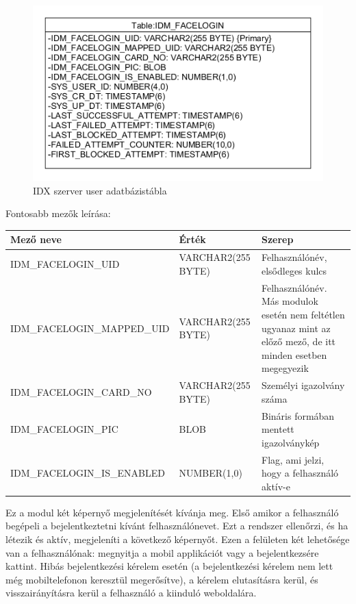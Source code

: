 \begin{figure}[h]
 \begin{minipage}{1\textwidth} 
\centering
    \includegraphics[scale=0.7]{img/facelogin_idm_db}
    \caption{IDX szerver user adatbázistábla}
 \end{minipage}
\end{figure}

Fontosabb mezők leírása:

\begin{tabular}{|p{6.5cm}|p{3cm} |p{4cm}|}
   	\hline
	\textbf{Mező neve} & \textbf{Érték} & \textbf{Szerep}\\ \hline
	IDM\_FACELOGIN\_UID & VARCHAR2(255 BYTE) & Felhasználónév, elsődleges kulcs \\ \hline
	IDM\_FACELOGIN\_MAPPED\_UID & VARCHAR2(255 BYTE) & Felhasználónév. Más modulok esetén nem feltétlen ugyanaz mint az előző mező, de itt minden esetben megegyezik \\ \hline
	IDM\_FACELOGIN\_CARD\_NO & VARCHAR2(255 BYTE)& Személyi igazolvány száma \\ \hline
	IDM\_FACELOGIN\_PIC & BLOB & Bináris formában mentett igazolványkép \\ \hline
	IDM\_FACELOGIN\_IS\_ENABLED & NUMBER(1,0) & Flag, ami jelzi, hogy a felhasználó aktív-e \\ \hline
	\end{tabular}


Ez a modul két képernyő megjelenítését kívánja meg. Első amikor a felhasználó begépeli a bejelentkeztetni kívánt felhasználónevet. Ezt a rendszer ellenőrzi, és ha létezik és aktív, megjeleníti a következő képernyőt. Ezen a felületen két lehetősége van a felhasználónak: megnyitja a mobil applikációt vagy a bejelentkezsére kattint. Hibás bejelentkezési kérelem esetén (a bejelentkezési kérelem nem lett még mobiltelefonon keresztül megerősítve), a kérelem elutasításra kerül, és visszairányításra kerül a felhasználó a kiinduló weboldalára.

